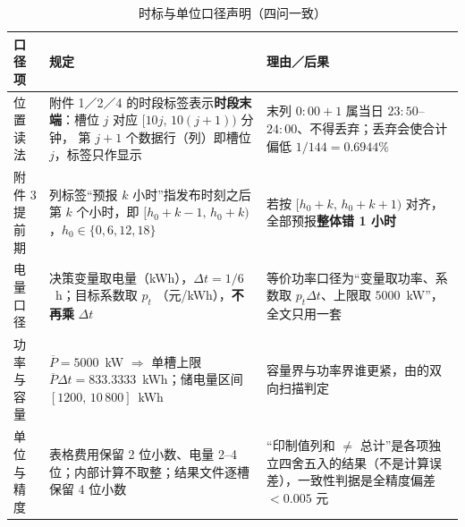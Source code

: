 \begin{table}[htbp]
  \centering
  \caption{时标与单位口径声明（四问一致）}
  \label{tab:unit-decl}
  \footnotesize
  \setlength{\tabcolsep}{4pt}
  \begin{tabularx}{\linewidth}{L{2.2cm} L{6.2cm} Y}
    \toprule
    口径项 & 规定 & 理由／后果 \\
    \midrule
    位置读法 & 附件 1／2／4 的时段标签表示\textbf{时段末端}：槽位 \(j\) 对应 \([10j,\,10(j+1))\) 分钟，
        第 \(j+1\) 个数据行（列）即槽位 \(j\)，标签只作显示 & 末列 \(0{:}00{+}1\) 属当日
        \(23{:}50\)--\(24{:}00\)、不得丢弃；丢弃会使合计偏低 \(1/144=0.6944\%\) \\
    附件 3 提前期 & 列标签“预报 \(k\) 小时”指发布时刻之后第 \(k\) 个小时，即
        \([h_0+k-1,\,h_0+k)\)，\(h_0\in\{0,6,12,18\}\) & 若按 \([h_0+k,\,h_0+k+1)\) 对齐，
        全部预报\textbf{整体错 1 小时} \\
    电量口径 & 决策变量取电量（\unit{kWh}），\(\Delta t=1/6\)~\unit{h}；目标系数取 \(p_t\)
        （\unit{元/kWh}），\textbf{不再乘} \(\Delta t\) & 等价功率口径为“变量取功率、系数取
        \(p_t\Delta t\)、上限取 \(5000\)~\unit{kW}”，全文只用一套 \\
    功率与容量 & \(\overline P=5000\)~\unit{kW} \(\Rightarrow\) 单槽上限
        \(\overline P\Delta t=833.3333\)~\unit{kWh}；储电量区间 \([1200,\,10\,800]\)~\unit{kWh}
        & 容量界与功率界谁更紧，由的双向扫描判定 \\
    单位与精度 & 表格费用保留 2 位小数、电量 2--4 位；内部计算不取整；结果文件逐槽保留 4 位小数
        & “印制值列和 \(\ne\) 总计”是各项独立四舍五入的结果（不是计算误差），一致性判据是全精度偏差 \(<0.005\) 元 \\
    \bottomrule
  \end{tabularx}
\end{table}

